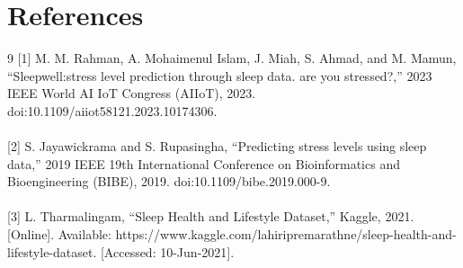 \documentclass[11pt, letterpaper]{article}
\begin{document}
    \section*{References}
    \begin{thebibliography}{9}
        [1] M. M. Rahman, A. Mohaimenul Islam, J. Miah, S. Ahmad, and M. Mamun, “Sleepwell:stress level prediction through sleep data. are you stressed?,” 2023 IEEE World AI IoT Congress (AIIoT), 2023. doi:10.1109/aiiot58121.2023.10174306.\\\\

        [2] S. Jayawickrama and S. Rupasingha, “Predicting stress levels using sleep data,” 2019 IEEE 19th International Conference on Bioinformatics and Bioengineering (BIBE), 2019. doi:10.1109/bibe.2019.000-9.\\\\

        [3] L. Tharmalingam, “Sleep Health and Lifestyle Dataset,” Kaggle, 2021. [Online]. Available: https://www.kaggle.com/lahiripremarathne/sleep-health-and-lifestyle-dataset. [Accessed: 10-Jun-2021].\\

    \end{thebibliography}
\end{document}
